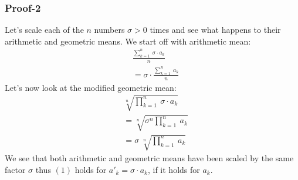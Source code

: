 \documentclass{article}
\begin{document}
\subsubsection*{Proof-2}
Let's scale each of the $n$ numbers $\sigma > 0$ times and see what happens to their arithmetic and geometric means. We start off with arithmetic mean:
\begin{equation*}
	\begin{aligned}
		&\frac{ \sum_{k=1}^{n}\ \sigma \cdot a_k }{n}\\
		&= \sigma \cdot \frac{\sum_{k=1}^n\ a_k}{n}
	\end{aligned}
\end{equation*}
Let's now look at the modified geometric mean:
\begin{equation*}
	\begin{aligned}
		&\sqrt[n]{ \prod_{k=1}^{n}\ \sigma \cdot a_k }\\
		&= \sqrt[n]{ \sigma^n \prod_{k=1}^{n}\ a_k }\\
		&= \sigma\ \sqrt[n]{ \prod_{k=1}^{n}\ a_k }
	\end{aligned}
\end{equation*}
We see that both arithmetic and geometric means have been scaled by the same factor $\sigma$ thus $(1)$ holds for $a'_{k} = \sigma \cdot a_k$, if it holds for $a_k$.
\end{document}
